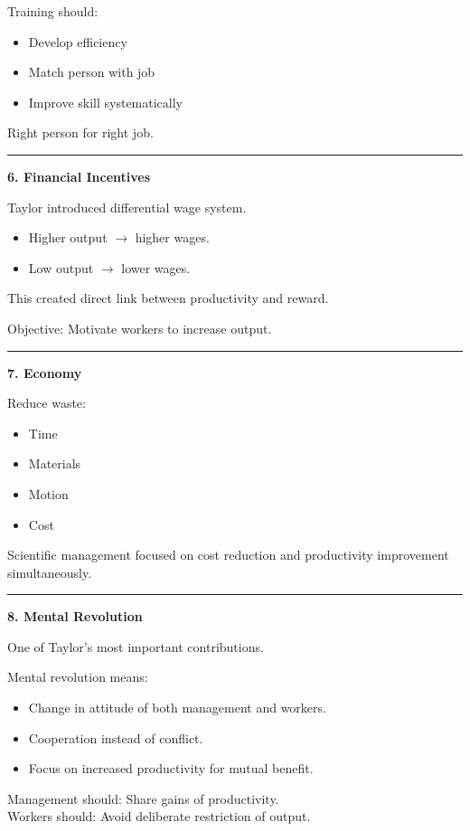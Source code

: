 \documentclass[10pt,a4paper]{article}
\newcommand{\separator}{\vspace{0.4em}\noindent\rule{\linewidth}{0.6pt}\vspace{0.4em}}
\begin{document}
Training should:

\begin{itemize}
  \item Develop efficiency
  \item Match person with job
  \item Improve skill systematically
\end{itemize}

Right person for right job.

\separator

\textbf{6. Financial Incentives}

Taylor introduced differential wage system.

\begin{itemize}
  \item Higher output $\rightarrow$ higher wages.
  \item Low output $\rightarrow$ lower wages.
\end{itemize}

This created direct link between productivity and reward.

Objective: Motivate workers to increase output.

\separator

\textbf{7. Economy}

Reduce waste:

\begin{itemize}
  \item Time
  \item Materials
  \item Motion
  \item Cost
\end{itemize}

Scientific management focused on cost reduction and productivity improvement
simultaneously.

\separator

\textbf{8. Mental Revolution}

One of Taylor's most important contributions.

Mental revolution means:

\begin{itemize}
  \item Change in attitude of both management and workers.
  \item Cooperation instead of conflict.
  \item Focus on increased productivity for mutual benefit.
\end{itemize}

Management should: Share gains of productivity.\\
Workers should: Avoid deliberate restriction of output.
\end{document}
